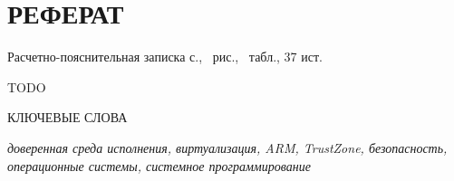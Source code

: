 \section*{РЕФЕРАТ}

Расчетно-пояснительная записка \pageref{LastPage} с., \totalfigures\ рис., \totaltables\ табл., 37 ист.

TODO

КЛЮЧЕВЫЕ СЛОВА

\textit{доверенная среда исполнения, виртуализация, ARM, TrustZone, безопасность, операционные системы, системное программирование}

\pagebreak
